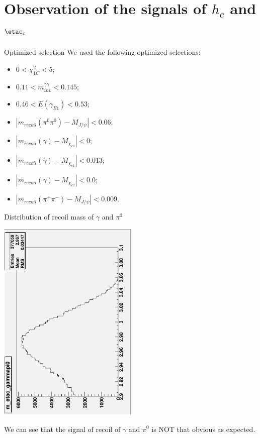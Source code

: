 \documentclass{beamer}
\begin{document}
\section{Observation of the signals of $h_c$ and ${\etac}_c$}
\begin{frame}{Optimized selection}
We used the following optimized selections:
        \begin{itemize}
        \item $0<\chi_{1C}^2<5$;
        \item $0.11<m_{inv}^{\gamma \gamma}<0.145$;
        \item $0.46<E(\gamma_{E1})<0.53$;
        \item $|m_{recoil}(\pi^0 \pi^0)-M_{J/\psi}|<0.06$;
        \item $|m_{recoil}(\gamma)-M_{\chi_{c0}}|<0$;
        \item $|m_{recoil}(\gamma)-M_{\chi_{c1}}|<0.013$;
        \item $|m_{recoil}(\gamma)-M_{\chi_{c2}}|<0.0$;
        \item $|m_{recoil}(\pi^+ \pi^-)-M_{J/\psi}|<0.009$.
        \end{itemize}
\end{frame}

        \begin{frame}{Distribution of recoil mass of $\gamma$ and $\pi^0$}
        \begin{center}
        \vskip -1.0cm
        \includegraphics[width=0.5\textwidth,angle=270]{figure/12_m_etac_gammapi0.eps}
        \end{center}
        We can see that the signal of recoil of $\gamma$ and $\pi^0$ is \color{red}NOT \color{black}that obvious as expected.
        \end{frame}
\end{document}
